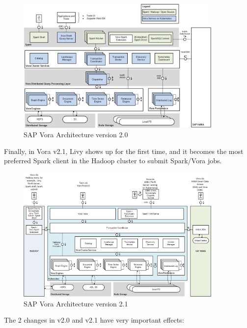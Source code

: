 \documentclass[article,colorback,accentcolor=tud4c]{tudreport}
\begin{document}
\begin{figure}[!h]
	\centering
	\includegraphics[width=0.9\textwidth]{vora20}
	\caption{SAP Vora Architecture version 2.0\cite{vora 2.0 architecture}}
\end{figure}

Finally, in Vora v2.1, Livy shows up for the first time, and it becomes the most preferred Spark client in the Hadoop cluster to submit Spark/Vora jobs.

\begin{figure}[!h]
	\centering
	\includegraphics[width=0.9\textwidth]{vora21}
	\caption{SAP Vora Architecture version 2.1\cite{vora 2.1 architecture}}
\end{figure}

The 2 changes in v2.0 and v2.1 have very important effects:
\end{document}
